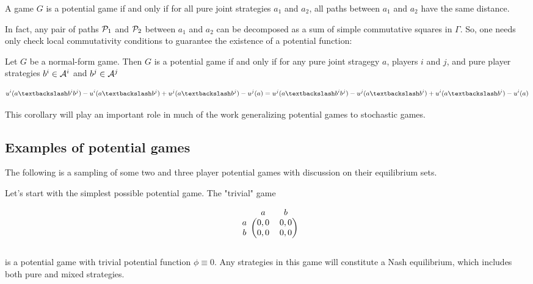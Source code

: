 \begin{prop}
A game $G$ is a potential game if and only if for all pure joint strategies $a_1$ and $a_2$, all paths between $a_1$ and $a_2$ have the same distance.
\end{prop}

In fact, any pair of paths $\PP_1$ and $\PP_2$ between $a_1$ and $a_2$ can be decomposed as a sum of simple commutative squares in $\Gamma$. So, one needs only check local commutativity conditions to guarantee the existence of a potential function:

\begin{cor}\cite{monderer1996potential}
Let $G$ be a normal-form game. Then $G$ is a potential game if and only if for any pure joint stragegy $a$, players $i$ and $j$, and pure player strategies $b^i \in \AA^i$ and $b^j \in \AA^j$

$$
u^i(\asub{a}{b^ib^j}) - u^i(\asub{a}{b^j}) + u^j(\asub{a}{b^j}) - u^j(a) = u^j(\asub{a}{b^ib^j}) - u^j(\asub{a}{b^i}) + u^i(\asub{a}{b^i}) - u^i(a)
$$
\label{cor:commsquare}
\end{cor}

This corollary will play an important role in much of the work generalizing potential games to stochastic games.


\subsection{Examples of potential games}

The following is a sampling of some two and three player potential games with discussion on their equilibrium sets.

Let's start with the simplest possible potential game. The "trivial" game

\begin{equation}

   \begin{blockarray}{ccc}
 & a & b \\
\begin{block}{c(cc)}
  a & 0,0 & 0,0  \\
  b & 0,0  & 0,0  \\
\end{block}
\end{blockarray} 

\label{eq:trivgame}
\end{equation}

is a potential game with trivial potential function $\phi \equiv 0$. Any strategies in this game will constitute a Nash equilibrium, which includes both pure and mixed strategies.

